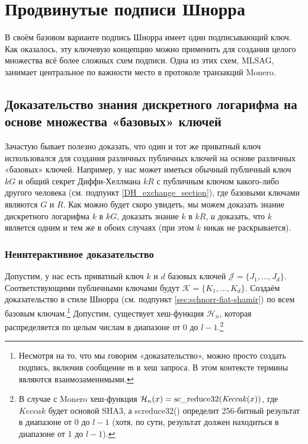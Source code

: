 \chapter{Продвинутые подписи Шнорра}
\label{chapter:advanced-schnorr}

В своём базовом варианте подпись Шнорра имеет один подписывающий ключ. Как оказалось, эту ключевую концепцию можно применить для создания целого множества всё более слож\-ных схем подписи. Одна из этих схем, MLSAG, занимает центральное по важности место в протоколе транзакций Monero.



\section{Доказательство знания дискретного логарифма на основе множества «базовых» ключей}
\label{sec:proofs-discrete-logarithm-multiple-bases}

Зачастую бывает полезно доказать, что один и тот же приватный ключ использовался для создания различных публичных ключей на основе различных «базовых» ключей. Например, у нас может иметься обычный публичный ключ $k G$ и общий секрет Диффи-Хеллмана $k R$ с публичным ключом какого-либо другого человека (см. подпункт \ref{DH_exchange_section}), где базовыми ключами являются $G$ и $R$. Как можно будет скоро увидеть, мы можем доказать знание дискретного логарифма $k$ в $k G$, доказать знание $k$ в $k R$, {\em и} доказать, что $k$ является одним и тем же в обоих случаях (при этом $k$ никак не раскрывается).


\subsection*{Неинтерактивное доказательство}

Допустим, у нас есть приватный ключ $k$ и $d$ базовых ключей $\mathcal{J} = \{J_1,...,J_d\}$. Соответствую\-щими публичными ключами будут $\mathcal{K} = \{K_1,...,K_d\}$. Создаём доказательство в стиле Шнорра (см. подпункт \ref{sec:schnorr-fiat-shamir}) по всем базовым ключам.\footnote{Несмотря на то, что мы говорим «доказательство», можно просто создать подпись, включив сообщение $\mathfrak{m}$ в хеш запроса. В этом контексте термины являются взаимозаменимыми.} Допустим, существует хеш-функция \(\mathcal{H}_n\), которая распределяется по целым числам в диапазоне от 0 до $l-1$.\footnote{В случае с Monero хеш-функция $\mathcal{H}_n(x) = \textrm{sc\textunderscore reduce32}(\mathit{Keccak}(x))$, где $\mathit{Keccak}$ будет основой SHA3, а sc\textunderscore reduce32() определит 256-битный результат в диапазоне от 0 до $l-1$ (хотя, по сути, результат должен находиться в диапазоне от 1 до $l-1$).} 


